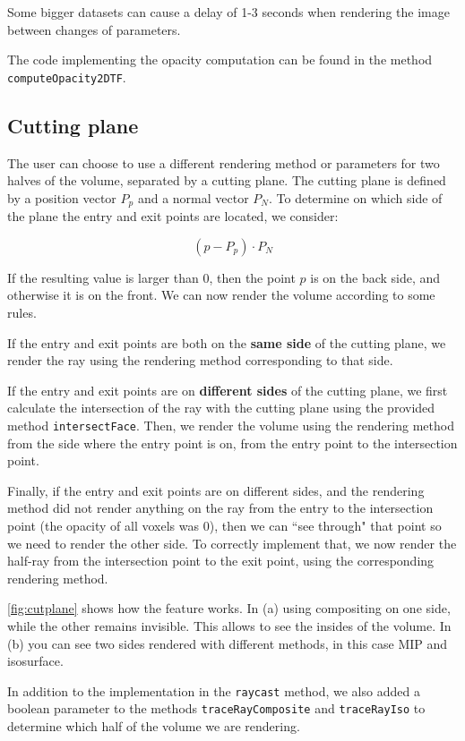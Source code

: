 \documentclass[a4paper]{article}
\begin{document}
Some bigger datasets can cause a delay of 1-3 seconds when rendering the image between changes of parameters.

The code implementing the opacity computation can be found in the method {\tt computeOpacity2DTF}.

\subsection{Cutting plane}

The user can choose to use a different rendering method or parameters for two halves of the volume, separated by a cutting plane. The cutting plane is defined by a position vector $P_p$ and a normal vector $P_N$. To determine on which side of the plane the entry and exit points are located, we consider:

$$(p-P_p)\cdot P_N$$

\noindent If the resulting value is larger than 0, then the point $p$ is on the back side, and otherwise it is on the front. We can now render the volume according to some rules.

If the entry and exit points are both on the \textbf{same side} of the cutting plane, we render the ray using the rendering method corresponding to that side.

If the entry and exit points are on \textbf{different sides} of the cutting plane, we first calculate the intersection of the ray with the cutting plane using the provided method {\tt intersectFace}. Then, we render the volume using the rendering method from the side where the entry point is on, from the entry point to the intersection point.

Finally, if the entry and exit points are on different sides, and the rendering method did not render anything on the ray from the entry to the intersection point (the opacity of all voxels was $0$), then we can ``see through" that point so we need to render the other side. To correctly implement that, we now render the half-ray from the intersection point to the exit point, using the corresponding rendering method.

\autoref{fig:cutplane} shows how the feature works. In (a) using compositing on one side, while the other remains invisible. This allows to see the insides of the volume. In (b) you can see two sides rendered with different methods, in this case MIP and isosurface.

In addition to the implementation in the {\tt raycast} method, we also added a boolean parameter to the methods {\tt traceRayComposite} and {\tt traceRayIso} to determine  which half of the volume we are rendering.
\end{document}

